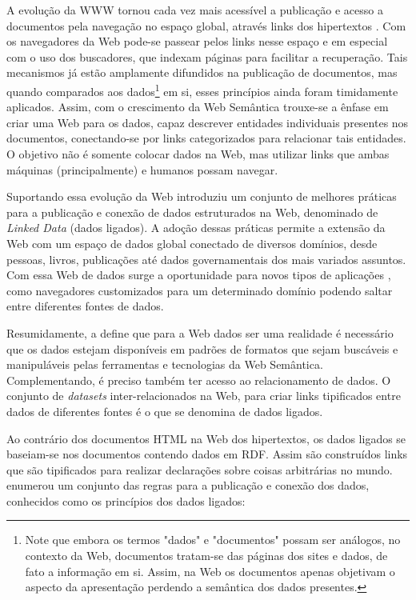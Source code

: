 A evolução da WWW tornou cada vez mais acessível a publicação e acesso a documentos pela navegação no espaço global, através links dos hipertextos \citep{Bizer2009}. Com os navegadores da Web pode-se passear pelos links nesse espaço e em especial com o uso dos buscadores, que indexam páginas para facilitar a recuperação. Tais mecanismos já estão amplamente difundidos na publicação de documentos, mas quando comparados aos dados\footnote{Note que embora os termos "dados" e "documentos" possam ser análogos, no contexto da Web, documentos tratam-se das páginas dos sites e dados, de fato a informação em si. Assim, na Web os documentos apenas objetivam o aspecto da apresentação perdendo a semântica dos dados presentes.} em si, esses princípios ainda foram timidamente aplicados. Assim, com o crescimento da Web Semântica trouxe-se a ênfase em criar uma Web para os dados, capaz descrever entidades individuais presentes nos documentos, conectando-se por links categorizados para relacionar tais entidades. O objetivo não é somente colocar dados na Web, mas utilizar links que ambas máquinas (principalmente) e humanos possam navegar.

Suportando essa evolução da Web \citep{LinkedData:2006} introduziu um conjunto de melhores práticas para a publicação e conexão de dados estruturados na Web, denominado de \textit{Linked Data} (dados ligados). A adoção dessas práticas permite a extensão da Web com um espaço de dados global conectado de diversos domínios, desde pessoas, livros, publicações até dados governamentais dos mais variados assuntos. Com essa Web de dados surge a oportunidade para novos tipos de aplicações \citep{Bizer2009}, como navegadores customizados para um determinado domínio podendo saltar entre diferentes fontes de dados.

Resumidamente, a \cite{LinkedDataW3C} define que para a Web dados ser uma realidade é necessário que os dados estejam disponíveis em padrões de formatos que sejam buscáveis e manipuláveis pelas ferramentas e tecnologias da Web Semântica. Complementando, é preciso também ter acesso ao relacionamento de dados. O conjunto de \textit{datasets} inter-relacionados na Web, para criar links tipificados entre dados de diferentes fontes é o que se denomina de dados ligados.

Ao contrário dos documentos HTML na Web dos hipertextos, os dados ligados se baseiam-se nos documentos contendo dados em RDF. Assim são construídos links que são tipificados para realizar declarações sobre coisas arbitrárias no mundo. \cite{LinkedData:2006} enumerou um conjunto das regras para a publicação e conexão dos dados, conhecidos como os princípios dos dados ligados:

